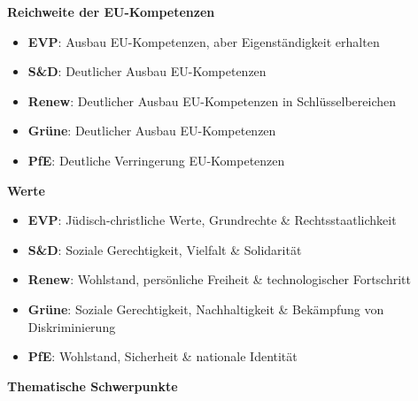 \documentclass[11pt]{article}
\newcommand{\logoOne}{Logos/jef.png}
\newcommand{\logoTwo}{Logos/simep.png}
\begin{document}
\newpage


\vspace*{1cm}

\begin{minipage}[t]{0.45\textwidth}
    \textbf{\Large Reichweite der EU-Kompetenzen}
    \raggedright
    \begin{itemize}
        \item \textbf{EVP}: {\small Ausbau EU-Kompetenzen, aber Eigenständigkeit erhalten}
        \item \textbf{S\&D}: {\small Deutlicher Ausbau EU-Kompetenzen}
        \item \textbf{Renew}: {\small Deutlicher Ausbau EU-Kompetenzen in Schlüsselbereichen}
        \item \textbf{Grüne}: {\small Deutlicher Ausbau EU-Kompetenzen}
        \item \textbf{PfE}: {\small Deutliche Verringerung EU-Kompetenzen}
    \end{itemize}
    \textbf{\Large Werte}
    \raggedright
    \begin{itemize}
        \item \textbf{EVP}: {\small Jüdisch-christliche Werte, Grundrechte \& Rechtsstaatlichkeit}
        \item \textbf{S\&D}: {\small Soziale Gerechtigkeit, Vielfalt \& Solidarität}
        \item \textbf{Renew}: {\small Wohlstand, persönliche Freiheit \& technologischer Fortschritt}
        \item \textbf{Grüne}: {\small Soziale Gerechtigkeit, Nachhaltigkeit \& Bekämpfung von Diskriminierung}
        \item \textbf{PfE}: {\small Wohlstand, Sicherheit \& nationale Identität}
    \end{itemize}
    \textbf{\Large Thematische Schwerpunkte}
    \raggedright
    \begin{itemize}

\end{itemize}
\end{minipage}
\end{document}
